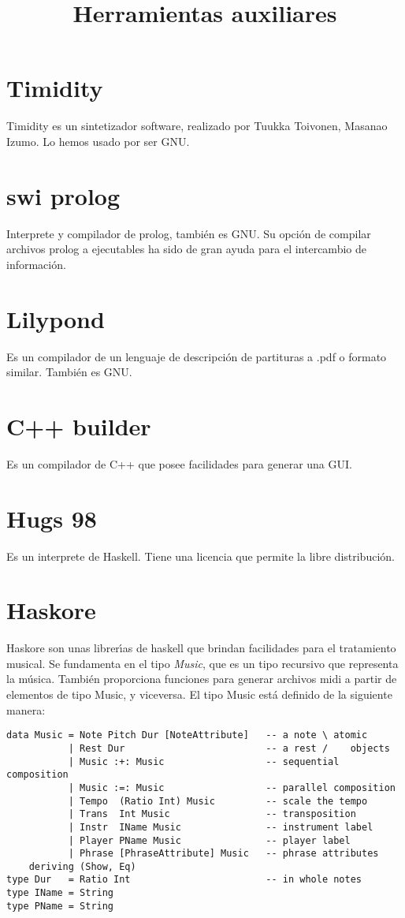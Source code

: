 \documentclass[a4paper,11pt]{article}
\title{Herramientas auxiliares}
\begin{document}
\maketitle
\tableofcontents
\section{Timidity}
Timidity es un sintetizador software, realizado por Tuukka Toivonen, Masanao Izumo. Lo hemos usado por ser GNU.

\section{swi prolog}
Interprete y compilador de prolog, tambi\'en es GNU. Su opci\'on de compilar archivos prolog a ejecutables ha sido de gran ayuda para el intercambio de informaci\'on.

\section{Lilypond}
Es un compilador de un lenguaje de descripci\'on de partituras a .pdf o formato similar. Tambi\'en es GNU.

\section{C++ builder}
Es un compilador de C++ que posee facilidades para generar una GUI.

\section{Hugs 98}
Es un interprete de Haskell. Tiene una licencia que permite la libre distribuci\'on.

\section{Haskore}
Haskore son unas librer\'\i as de haskell que brindan facilidades para el tratamiento musical. Se fundamenta en el tipo \emph{Music}, que es un tipo recursivo que representa la m\'usica. Tambi\'en proporciona funciones para generar archivos midi a partir de elementos de tipo Music, y viceversa. El tipo Music est\'a definido de la siguiente manera:
\begin{verbatim}
data Music = Note Pitch Dur [NoteAttribute]   -- a note \ atomic 
           | Rest Dur                         -- a rest /    objects
           | Music :+: Music                  -- sequential composition
           | Music :=: Music                  -- parallel composition
           | Tempo  (Ratio Int) Music         -- scale the tempo
           | Trans  Int Music                 -- transposition
           | Instr  IName Music               -- instrument label
           | Player PName Music               -- player label
           | Phrase [PhraseAttribute] Music   -- phrase attributes
    deriving (Show, Eq)
type Dur   = Ratio Int                        -- in whole notes
type IName = String
type PName = String
\end{verbatim}
\end{document}
